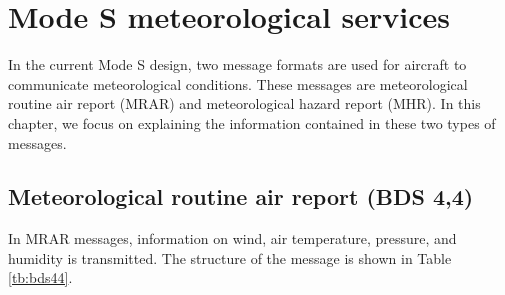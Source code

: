 \chapter{Mode S meteorological services}

In the current Mode S design, two message formats are used for aircraft to communicate meteorological conditions. These messages are meteorological routine air report (MRAR) and meteorological hazard report (MHR). In this chapter, we focus on explaining the information contained in these two types of messages.

\section{Meteorological routine air report (BDS 4,4)}

In MRAR messages, information on wind, air temperature, pressure, and humidity is transmitted. The structure of the message is shown in Table \ref{tb:bds44}.


